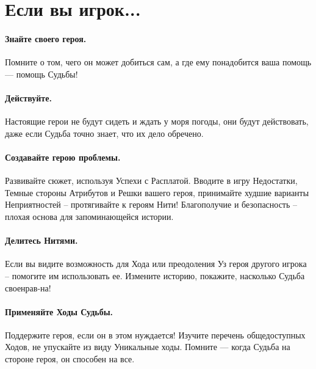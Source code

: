 \section*{Если вы игрок...}

\paragraph{Знайте своего героя.} Помните о том, чего он может добиться сам, а где ему понадобится ваша помощь — помощь Судьбы!
\paragraph{Действуйте.} Настоящие герои не будут сидеть и ждать у моря погоды, они будут действовать, даже если Судьба точно знает, что их дело обречено.
\paragraph{Создавайте герою проблемы.} Развивайте сюжет, используя Успехи с Расплатой. Вводите в игру Недостатки, Темные стороны Атрибутов и Решки вашего героя, принимайте худшие варианты Неприятностей – протягивайте к героям Нити! Благополучие и безопасность – плохая основа для запоминающейся истории.
\paragraph{Делитесь Нитями.} Если вы видите возможность для Хода или преодоления Уз героя другого игрока – помогите им использовать ее. Измените историю, покажите, насколько Судьба своенрав-на!
\paragraph{Применяйте Ходы Судьбы.} Поддержите героя, если он в этом нуждается! Изучите перечень общедоступных Ходов, не упускайте из виду Уникальные ходы. Помните — когда Судьба на стороне героя, он способен на все.